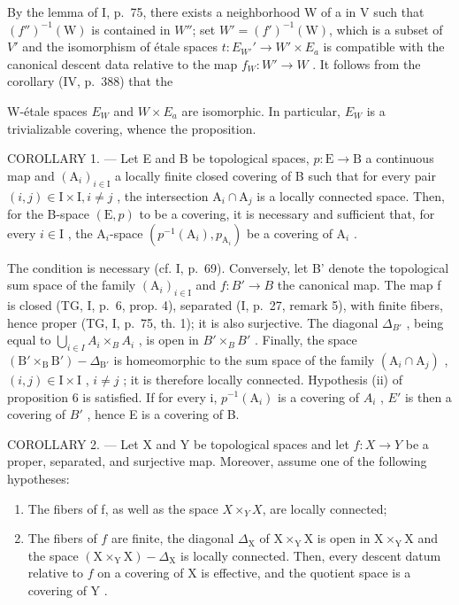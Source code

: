 By the lemma of I, p.~75, there exists a neighborhood W of a in V such that \((f'')^{-1}(\mathrm{W})\) is contained in \(W''\); set \(W'=(f')^{-1}(\mathrm{W})\), which is a subset of \(V'\) and the isomorphism of étale spaces \(t: E_{W'}' \to W' \times E_a\) is compatible with the canonical descent data relative to the map \(f_W: W' \to W\) . It follows from the corollary (IV, p.~388) that the

W-étale spaces \(E_{W}\) and \(W \times E_{a}\) are isomorphic. In particular, \(E_{W}\) is a trivializable covering, whence the proposition.

COROLLARY 1. --- Let E and B be topological spaces, \(p\colon\mathrm{E}\to\mathrm{B}\) a continuous map and \((\mathrm{A}_{i})_{i\in\mathrm{I}}\) a locally finite closed covering of B such that for every pair \((i,j)\in\mathrm{I}\times\mathrm{I}, i\neq j\) , the intersection \(\mathrm{A}_{i}\cap\mathrm{A}_{j}\) is a locally connected space. Then, for the B-space \((\mathrm{E},p)\) to be a covering, it is necessary and sufficient that, for every \(i\in\mathrm{I}\) , the \(\mathrm{A}_{i} \)-space \((p^{-1}(\mathrm{A}_{i}),p_{\mathrm{A}_{i}})\) be a covering of \(\mathrm{A}_{i}\) .

The condition is necessary (cf. I, p.~69). Conversely, let B' denote the topological sum space of the family \((\mathrm{A}_{i})_{i\in\mathrm{I}}\) and \(f\colon B'\to B\) the canonical map. The map f is closed (TG, I, p.~6, prop. 4), separated (I, p.~27, remark 5), with finite fibers, hence proper (TG, I, p.~75, th. 1); it is also surjective. The diagonal \(\Delta_{B'}\) , being equal to \(\bigcup_{i\in I}A_{i}\times_{B}A_{i}\) , is open in \(B'\times_{B}B'\) . Finally, the space \((\mathrm{B}'\times_{\mathrm{B}}\mathrm{B}')-\Delta_{\mathrm{B'}}\) is homeomorphic to the sum space of the family \((\mathrm{A}_{i}\cap\mathrm{A}_{j})\) , \((i,j)\in\mathrm{I}\times\mathrm{I}\) , \(i\neq j\) ; it is therefore locally connected. Hypothesis (ii) of proposition 6 is satisfied. If for every i, \(p^{-1}(\mathrm{A}_{i})\) is a covering of \(A_{i}\) , \(E'\) is then a covering of \(B'\) , hence E is a covering of B.

COROLLARY 2. --- Let X and Y be topological spaces and let \(f\colon X \to Y\) be a proper, separated, and surjective map. Moreover, assume one of the following hypotheses:

\begin{enumerate}
\def\labelenumi{(\roman{enumi})}
\item
  The fibers of f, as well as the space \(X\times_Y X\), are locally connected;
\item
  The fibers of \(f\) are finite, the diagonal \(\Delta_{\mathrm{X}}\) of \(\mathrm{X} \times_{\mathrm{Y}} \mathrm{X}\) is open in \(\mathrm{X} \times_{\mathrm{Y}} \mathrm{X}\) and the space \((\mathrm{X} \times_{\mathrm{Y}} \mathrm{X}) - \Delta_{\mathrm{X}}\) is locally connected. Then, every descent datum relative to \(f\) on a covering of \(\mathrm{X}\) is effective, and the quotient space is a covering of \(\mathrm{Y}\) .
\end{enumerate}

